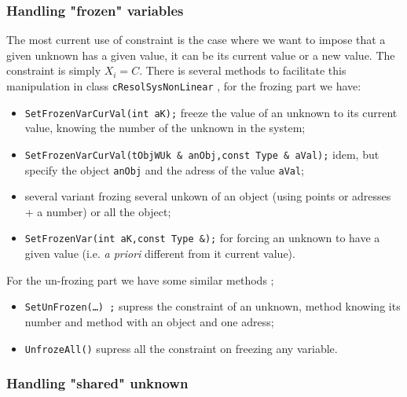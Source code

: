 
\subsubsection{Handling "frozen" variables}

The most current use of constraint is the case where we want to impose that a given unknown
has a given value, it can be its current value or a new value. The constraint is simply
$X_i=C$.   There is several methods to facilitate this manipulation in class {\tt cResolSysNonLinear} , for
the frozing part we have:


\begin{itemize}
     \item   {\tt SetFrozenVarCurVal(int aK);} freeze the value of an unknown to its current value,
              knowing the number of the unknown in the system;
     \item   {\tt SetFrozenVarCurVal(tObjWUk \& anObj,const  Type \& aVal);} idem, but specify the object {\tt anObj}
             and the adress of the value {\tt aVal};
     \item  several variant frozing several unkown of an object (using points or adresses + a number) or all the
            object;
      \item  {\tt SetFrozenVar(int aK,const  Type \&);}  for forcing an unknown to have a given value 
             (i.e. \emph{a priori} different from it current value).

\end{itemize}

For the un-frozing part we have some similar methods ;

\begin{itemize}
     \item   {\tt SetUnFrozen(\dots) ;} supress  the constraint of an unknown,  method knowing its number
             and method with an object and one adress;
      \item  {\tt UnfrozeAll()} supress all the constraint on freezing any variable.
\end{itemize}


\subsubsection{Handling "shared" unknown}

